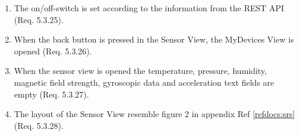 \documentclass[a4paper]{article}
\newlength{\testlabellength}
\newenvironment{testlist}{\begin{enumerate}[label=\bfseries Instruction \thesubsection.\arabic* , labelindent=0pt, labelwidth=\testlabellength , leftmargin=2cm]}{\end{enumerate}}
\newenvironment{precondition}{
{\color{white}BLARG}\\ 
\textbf{Precondition}
\begin{itemize}[labelindent=0cm, labelwidth=2cm , leftmargin=1cm]
}
{\end{itemize}}
\newenvironment{instruction}{
\textbf{Instructions:}
\begin{enumerate}[label=\bfseries  \arabic*., labelindent=0cm, labelwidth=2cm , leftmargin=1cm]
}
{\end{enumerate}}
\newenvironment{postcondition}{
\textbf{Postcondition:}
\begin{itemize}[labelindent=0cm, labelwidth=2cm , leftmargin=1cm]
}
{\end{itemize}}
\begin{document}
\begin{appendices}
\begin{testlist}
	\item The on/off-switch is set according to the information from the REST API (Req. 5.3.25).

		   
	\item When the back button is pressed in the Sensor View, the MyDevices View is opened (Req. 5.3.26).

		   
	\item When the sensor view is opened the temperature, pressure, humidity, magnetic field strength, gyroscopic data and acceleration text fields are empty (Req. 5.3.27).

		   
	\item The layout of the Sensor View resemble figure 2 in appendix  Ref \ref{refdocs:srs} (Req. 5.3.28).


\end{testlist}
\end{appendices}
\end{document}
